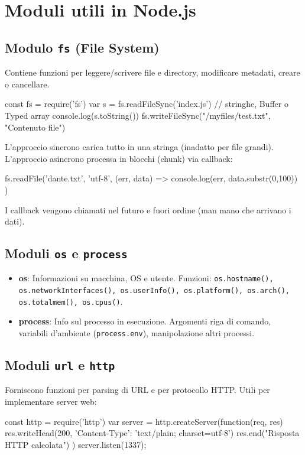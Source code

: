\section{Moduli utili in Node.js}
\subsection{Modulo \texttt{fs} (File System)}
Contiene funzioni per leggere/scrivere file e directory, modificare metadati, creare o cancellare. 

\begin{jsbox}[title={Esempio Sincrono}]
const fs = require('fs')
var s = fs.readFileSync('index.js') // stringhe, Buffer o Typed array
console.log(s.toString())
fs.writeFileSync("/myfiles/test.txt", "Contenuto file")
\end{jsbox}

L'approccio sincrono carica tutto in una stringa (inadatto per file grandi). L'approccio asincrono processa in blocchi (chunk) via callback:
\begin{jsbox}[title={Esempio Asincrono}]
fs.readFile('dante.txt', 'utf-8', 
  (err, data) => console.log(err, data.substr(0,100))
)
\end{jsbox}
I callback vengono chiamati nel futuro e fuori ordine (man mano che arrivano i dati).

\subsection{Moduli \texttt{os} e \texttt{process}}
\begin{itemize}
    \item \textbf{os}: Informazioni su macchina, OS e utente. Funzioni: \texttt{os.hostname(), os.networkInterfaces(), os.userInfo(), os.platform(), os.arch(), os.totalmem(), os.cpus()}.
    \item \textbf{process}: Info sul processo in esecuzione. Argomenti riga di comando, variabili d'ambiente (\texttt{process.env}), manipolazione altri processi.
\end{itemize}

\subsection{Moduli \texttt{url} e \texttt{http}}
Forniscono funzioni per parsing di URL e per protocollo HTTP. Utili per implementare server web:

\begin{jsbox}[title={Server Web HTTP}]
const http = require('http')
var server = http.createServer(function(req, res) {
  res.writeHead(200, {'Content-Type': 'text/plain; charset=utf-8'})
  res.end("Risposta HTTP calcolata")
})
server.listen(1337);
\end{jsbox}


